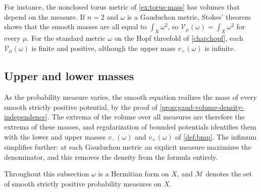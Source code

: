 For instance, the nonclosed torus metric of \cref{ex:torus-mass} has volumes that depend on the measure. If $n=2$ and $\omega$ is a Gauduchon metric, Stokes' theorem shows that the smooth masses are all equal to $\int_X\omega^2$, so $\mathcal V_\mu(\omega)=\int_X\omega^2$ for every $\mu$. For the standard metric $\omega$ on the Hopf threefold of \cref{chap:hopf}, each $\mathcal V_\mu(\omega)$ is finite and positive, although the upper mass $v_+(\omega)$ is infinite.

\subsection{Upper and lower masses}
\label{sec:gaud-volume-extrema}

As the probability measure varies, the smooth equation realizes the mass of every smooth strictly positive potential, by the proof of \cref{prop:gaud-volume-density-independence}. The extrema of the volume over all measures are therefore the extrema of these masses, and regularization of bounded potentials identifies them with the lower and upper masses $v_-(\omega)$ and $v_+(\omega)$ of \cref{def:bmp}. The infimum simplifies further: at each Gauduchon metric an explicit measure maximizes the denominator, and this removes the density from the formula entirely.

Throughout this subsection $\omega$ is a Hermitian form on $X$, and $\mathscr M$ denotes the set of smooth strictly positive probability measures on $X$.


